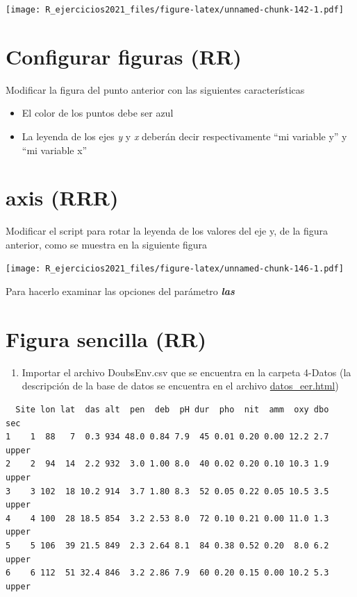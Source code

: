 \documentclass[]{book}
\providecommand{\tightlist}{%
  \setlength{\itemsep}{0pt}\setlength{\parskip}{0pt}}
\begin{document}
\texttt{[image: R\_ejercicios2021\_files/figure-latex/unnamed-chunk-142-1.pdf]}

\hypertarget{configurar-figuras-rr}{%
\section{Configurar figuras (RR)}\label{configurar-figuras-rr}}

Modificar la figura del punto anterior con las siguientes características

\begin{itemize}
\tightlist
\item
  El color de los puntos debe ser azul
\item
  La leyenda de los ejes \emph{y} y \emph{x} deberán decir respectivamente ``mi variable y'' y ``mi variable x''
\end{itemize}

\hypertarget{axis-rrr}{%
\section{axis (RRR)}\label{axis-rrr}}

Modificar el script para rotar la leyenda de los valores del eje y, de la figura anterior, como se muestra en la siguiente figura

\texttt{[image: R\_ejercicios2021\_files/figure-latex/unnamed-chunk-146-1.pdf]}

Para hacerlo examinar las opciones del parámetro \textbf{\emph{las}}

\hypertarget{figura-sencilla-rr}{%
\section{Figura sencilla (RR)}\label{figura-sencilla-rr}}

\begin{enumerate}
\def\labelenumi{\arabic{enumi}.}
\tightlist
\item
  Importar el archivo DoubsEnv.csv que se encuentra en la carpeta 4-Datos (la descripción de la base de datos se encuentra en el archivo \url{datos_eer.html})
\end{enumerate}

\begin{verbatim}
  Site lon lat  das alt  pen  deb  pH dur  pho  nit  amm  oxy dbo   sec
1    1  88   7  0.3 934 48.0 0.84 7.9  45 0.01 0.20 0.00 12.2 2.7 upper
2    2  94  14  2.2 932  3.0 1.00 8.0  40 0.02 0.20 0.10 10.3 1.9 upper
3    3 102  18 10.2 914  3.7 1.80 8.3  52 0.05 0.22 0.05 10.5 3.5 upper
4    4 100  28 18.5 854  3.2 2.53 8.0  72 0.10 0.21 0.00 11.0 1.3 upper
5    5 106  39 21.5 849  2.3 2.64 8.1  84 0.38 0.52 0.20  8.0 6.2 upper
6    6 112  51 32.4 846  3.2 2.86 7.9  60 0.20 0.15 0.00 10.2 5.3 upper
\end{verbatim}
\end{document}
